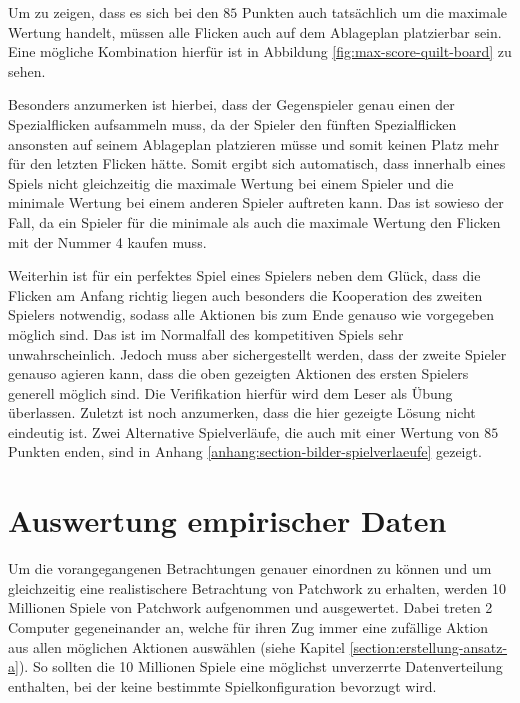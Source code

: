 Um zu zeigen, dass es sich bei den $85$ Punkten auch tatsächlich um die maximale Wertung handelt, müssen alle Flicken auch auf dem Ablageplan platzierbar sein. Eine mögliche Kombination hierfür ist in Abbildung \ref{fig:max-score-quilt-board} zu sehen.

Besonders anzumerken ist hierbei, dass der Gegenspieler genau einen der Spezialflicken aufsammeln muss, da der Spieler den fünften Spezialflicken ansonsten auf seinem Ablageplan platzieren müsse und somit keinen Platz mehr für den letzten Flicken hätte. Somit ergibt sich automatisch, dass innerhalb eines Spiels nicht gleichzeitig die maximale Wertung bei einem Spieler und die minimale Wertung bei einem anderen Spieler auftreten kann. Das ist sowieso der Fall, da ein Spieler für die minimale als auch die maximale Wertung den Flicken mit der Nummer 4 kaufen muss.

Weiterhin ist für ein perfektes Spiel eines Spielers neben dem Glück, dass die Flicken am Anfang richtig liegen auch besonders die Kooperation des zweiten Spielers notwendig, sodass alle Aktionen bis zum Ende genauso wie vorgegeben möglich sind. Das ist im Normalfall des kompetitiven Spiels sehr unwahrscheinlich. Jedoch muss aber sichergestellt werden, dass der zweite Spieler genauso agieren kann, dass die oben gezeigten Aktionen des ersten Spielers generell möglich sind. Die Verifikation hierfür wird dem Leser als Übung überlassen. Zuletzt ist noch anzumerken, dass die hier gezeigte Lösung nicht eindeutig ist. Zwei Alternative Spielverläufe, die auch mit einer Wertung von $85$ Punkten enden, sind in Anhang \ref{anhang:section-bilder-spielverlaeufe} gezeigt.

\pagebreak

\section{Auswertung empirischer Daten}
\label{section:auswertung-empirischer-daten}

Um die vorangegangenen Betrachtungen genauer einordnen zu können und um gleichzeitig eine realistischere Betrachtung von Patchwork zu erhalten, werden 10 Millionen Spiele von Patchwork aufgenommen und ausgewertet. Dabei treten 2 Computer gegeneinander an, welche für ihren Zug immer eine zufällige Aktion aus allen möglichen Aktionen auswählen (siehe Kapitel \ref{section:erstellung-ansatz-a}). So sollten die 10 Millionen Spiele eine möglichst unverzerrte Datenverteilung enthalten, bei der keine bestimmte Spielkonfiguration bevorzugt wird.

